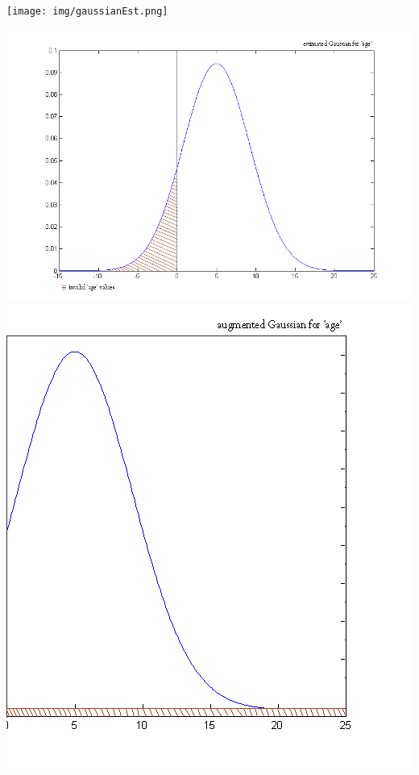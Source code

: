 \texttt{[image: img/gaussianEst.png]}

\begin{landscape}
\includegraphics[scale=0.55]{img/AgeRegress.png} \includegraphics[scale=0.55]{img/AgeRegress2.png} 
\end{landscape}





